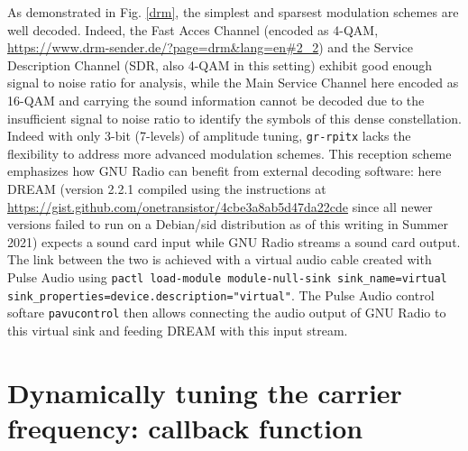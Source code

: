\documentclass{article}
\begin{document}
As demonstrated in Fig.
\ref{drm}, the simplest and sparsest modulation schemes are well decoded. Indeed, the Fast 
Acces Channel (encoded as 4-QAM, \url{https://www.drm-sender.de/?page=drm&lang=en#2_2}) 
and the Service Description Channel (SDR, also 4-QAM in this setting) exhibit good enough 
signal to noise ratio for analysis, while the Main Service Channel here encoded as 16-QAM 
and carrying the sound information cannot be decoded due to the insufficient signal to noise 
ratio to identify the symbols of this dense constellation.
Indeed with only 3-bit (7-levels) of amplitude tuning, {\tt gr-rpitx} lacks
the flexibility to address more advanced modulation schemes. This reception
scheme emphasizes how GNU Radio can benefit from external decoding software:
here DREAM (version 2.2.1 compiled using the instructions at
\url{https://gist.github.com/onetransistor/4cbe3a8ab5d47da22cde} since all
newer versions failed to run on a Debian/sid distribution as of this writing in
Summer 2021) expects a sound card input while GNU Radio streams a
sound card output. The link between the two is achieved with a virtual audio
cable created with Pulse Audio using
{\tt pactl load-module module-null-sink sink\_name=virtual 
sink\_properties=device.description="virtual"}. The Pulse Audio control softare
{\tt pavucontrol} then allows connecting the audio output of GNU Radio to this
virtual sink and feeding DREAM with this input stream.

\section{Dynamically tuning the carrier frequency: callback function}
\end{document}
